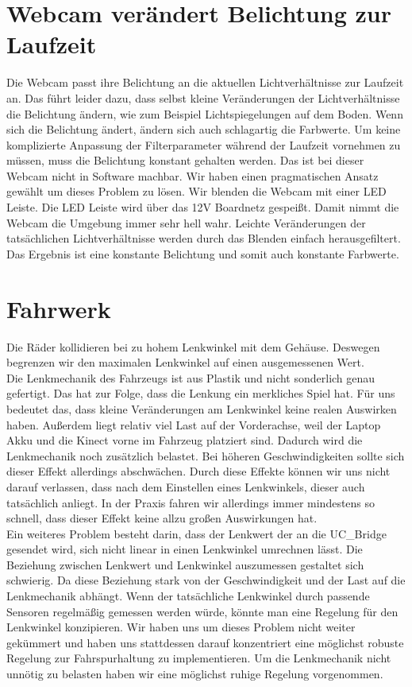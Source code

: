 \section{Webcam verändert Belichtung zur Laufzeit}
\label{sec:belichtung}
Die Webcam passt ihre Belichtung an die aktuellen Lichtverhältnisse zur Laufzeit an.
Das führt leider dazu, dass selbst kleine Veränderungen der Lichtverhältnisse die Belichtung ändern, wie zum Beispiel Lichtspiegelungen auf dem Boden.
Wenn sich die Belichtung ändert, ändern sich auch schlagartig die Farbwerte.
Um keine komplizierte Anpassung der Filterparameter während der Laufzeit vornehmen zu müssen, muss die Belichtung konstant gehalten werden.
Das ist bei dieser Webcam nicht in Software machbar.
Wir haben einen pragmatischen Ansatz gewählt um dieses Problem zu lösen.
Wir blenden die Webcam mit einer LED Leiste.
Die LED Leiste wird über das 12V Boardnetz gespeißt.
Damit nimmt die Webcam die Umgebung immer sehr hell wahr.
Leichte Veränderungen der tatsächlichen Lichtverhältnisse werden durch das Blenden einfach herausgefiltert. 
Das Ergebnis ist eine konstante Belichtung und somit auch konstante Farbwerte.

\section{Fahrwerk}
\label{sec:fahrwerk}
Die Räder kollidieren bei zu hohem Lenkwinkel mit dem Gehäuse.
Deswegen begrenzen wir den maximalen Lenkwinkel auf einen ausgemessenen Wert.
\\
Die Lenkmechanik des Fahrzeugs ist aus Plastik und nicht sonderlich genau gefertigt.
Das hat zur Folge, dass die Lenkung ein merkliches Spiel hat. 
Für uns bedeutet das, dass kleine Veränderungen am Lenkwinkel keine realen Auswirken haben. 
Außerdem liegt relativ viel Last auf der Vorderachse, weil der Laptop Akku und die Kinect vorne im Fahrzeug platziert sind.
Dadurch wird die Lenkmechanik noch zusätzlich belastet.
Bei höheren Geschwindigkeiten sollte sich dieser Effekt allerdings abschwächen. 
Durch diese Effekte können wir uns nicht darauf verlassen, dass nach dem Einstellen eines Lenkwinkels, dieser auch tatsächlich anliegt.
In der Praxis fahren wir allerdings immer mindestens so schnell, dass dieser Effekt keine allzu großen Auswirkungen hat.
\\
Ein weiteres Problem besteht darin, dass der Lenkwert der an die UC\_Bridge gesendet wird, sich nicht linear in einen Lenkwinkel umrechnen lässt.
Die Beziehung zwischen Lenkwert und Lenkwinkel auszumessen gestaltet sich schwierig.
Da diese Beziehung stark von der Geschwindigkeit und der Last auf die Lenkmechanik abhängt.
Wenn der tatsächliche Lenkwinkel durch passende Sensoren regelmäßig gemessen werden würde, könnte man eine Regelung für den Lenkwinkel konzipieren.
Wir haben uns um dieses Problem nicht weiter gekümmert und haben uns stattdessen darauf konzentriert eine möglichst robuste Regelung zur Fahrspurhaltung zu implementieren.
Um die Lenkmechanik nicht unnötig zu belasten haben wir eine möglichst ruhige Regelung vorgenommen.





